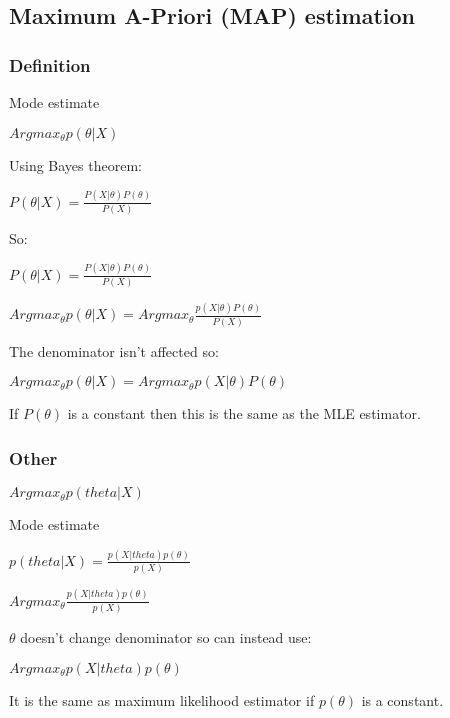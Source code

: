 
\subsection{Maximum A-Priori (MAP) estimation}

\subsubsection{Definition}

Mode estimate

\(Arg max_\theta p(\theta | X)\)

Using Bayes theorem:

\(P(\theta | X)= \frac{P(X|\theta )P(\theta)}{P(X)}\)

So:

\(P(\theta | X)= \frac{P(X|\theta )P(\theta)}{P(X)}\)

\(Argmax_\theta p(\theta | X)=Argmax_\theta \frac{p(X|\theta )P(\theta)}{P(X)}\)

The denominator isn't affected so:

\(Arg max_\theta p(\theta | X)=Arg max_\theta p(X|\theta )P(\theta)\)

If \(P(\theta )\) is a constant then this is the same as the MLE estimator.

\subsubsection{Other}

\(Argmax_\theta p(theta|X)\)

Mode estimate

\(p(theta|X)= \frac{p(X| theta)p(\theta )}{p(X)}\)

\(Argmax_\theta \frac{p(X| theta)p(\theta )}{p(X)}\)

\(\theta \) doesn't change denominator so can instead use:

\(Argmax_\theta p(X| theta)p(\theta )\)

It is the same as maximum likelihood estimator if \(p(\theta )\) is a constant. 

